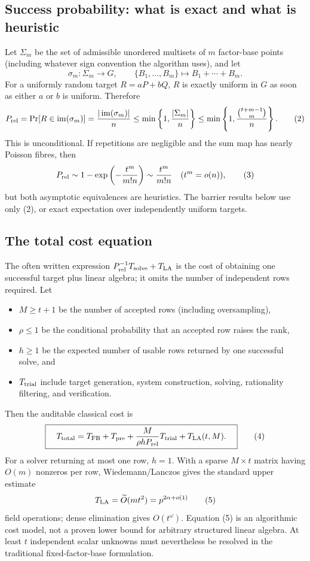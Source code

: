 \documentclass[11pt]{article}
\newcommand{\softO}{\widetilde O}
\newcommand{\im}{\operatorname{im}}
\begin{document}
\subsection{Success probability: what is exact and what is heuristic}

Let $\Sigma_m$ be the set of admissible unordered multisets of $m$ factor-base
points (including whatever sign convention the algorithm uses), and let
\[
 \sigma_m:\Sigma_m\longrightarrow G,\qquad
 \{B_1,\ldots,B_m\}\longmapsto B_1+\cdots+B_m.
\]
For a uniformly random target $R=aP+bQ$, $R$ is exactly uniform in $G$ as soon
as either $a$ or $b$ is uniform.  Therefore
\[
 P_{\rm rel}=\Pr[R\in\im(\sigma_m)]
 =\frac{|\im(\sigma_m)|}{n}
 \le \min\left\{1,\frac{|\Sigma_m|}{n}\right\}
 \le \min\left\{1,\frac{\binom{t+m-1}{m}}{n}\right\}.               \tag{2}
\]
This is unconditional.  If repetitions are negligible and the sum map has
nearly Poisson fibres, then
\[
 P_{\rm rel}\sim 1-\exp\left(-\frac{t^m}{m!n}\right)
 \sim \frac{t^m}{m!n}\quad(t^m=o(n)),                               \tag{3}
\]
but both asymptotic equivalences are heuristics.  The barrier results below use
only (2), or exact expectation over independently uniform targets.

\subsection{The total cost equation}

The often written expression $P_{\rm rel}^{-1}T_{\rm solve}+T_{\rm LA}$ is the
cost of obtaining one successful target plus linear algebra; it omits the
number of independent rows required.  Let
\begin{itemize}
 \item $M\ge t+1$ be the number of accepted rows (including oversampling),
 \item $\rho\le1$ be the conditional probability that an accepted row raises
       the rank,
 \item $h\ge1$ be the expected number of usable rows returned by one successful
       solve, and
 \item $T_{\rm trial}$ include target generation, system construction, solving,
       rationality filtering, and verification.
\end{itemize}
Then the auditable classical cost is
\[
 \boxed{\quad
 T_{\rm total}=T_{\rm FB}+T_{\rm pre}
 +\frac{M}{\rho hP_{\rm rel}}T_{\rm trial}
 +T_{\rm LA}(t,M).\quad}                                             \tag{4}
\]
For a solver returning at most one row, $h=1$.  With a sparse $M\times t$
matrix having $O(m)$ nonzeros per row, Wiedemann/Lanczos gives the standard
upper estimate
\[
 T_{\rm LA}=\softO(mt^2)=p^{2\alpha+o(1)}                            \tag{5}
\]
field operations; dense elimination gives $O(t^\omega)$.  Equation (5) is an
algorithmic cost model, not a proven lower bound for arbitrary structured
linear algebra.  At least $t$ independent scalar unknowns must nevertheless be
resolved in the traditional fixed-factor-base formulation.
\end{document}
